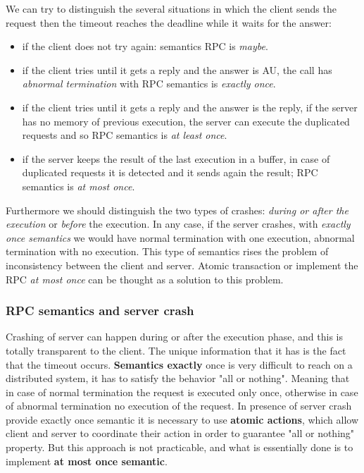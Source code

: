 \documentclass[11pt,a4paper]{article}
\begin{document}
We can try to distinguish the several situations in which the client sends the request then the timeout reaches the deadline while it waits for the answer:
\begin{itemize}
	\item if the client does not try again: semantics RPC is \textit{maybe}.
	\item if the client tries until it gets a reply and the answer is AU, the call has \textit{abnormal termination} with RPC semantics is \textit{exactly once}.
	\item if the client tries until it gets a reply and the answer is the reply, if the server has no memory of previous execution, the server can execute the duplicated requests and so RPC semantics is \textit{at least once}.
	\item if the server keeps the result of the last execution in a buffer, in case of duplicated requests it is detected and it sends again
	the result; RPC semantics is \textit{at most once}.
\end{itemize}

Furthermore we should distinguish the two types of crashes: \textit{during or after the execution} or \textit{before} the execution. In any case, if the server crashes, with \textit{exactly once semantics} we would have normal termination with one execution, abnormal termination with no execution. This type of semantics rises the problem of inconsistency between the client and server. Atomic transaction or implement the RPC \textit{at most once} can be thought as a solution to this problem.

\subsubsection{RPC semantics and server crash}
Crashing of server can happen during or after the execution phase, and this is totally transparent to the client. The unique information that it has is the fact that the timeout occurs.
\textbf{Semantics exactly} once is very difficult to reach on a distributed system, it has to satisfy the behavior "all or nothing". Meaning that in case of normal termination the request is executed only once, otherwise in case of abnormal termination no execution of the request. In presence of server crash provide exactly once semantic it is necessary to use \textbf{atomic actions},  which allow client and server to coordinate their action in order to guarantee "all or nothing" property. But this approach is not practicable, and what is essentially done is to implement \textbf{at most once semantic}.
\end{document}
